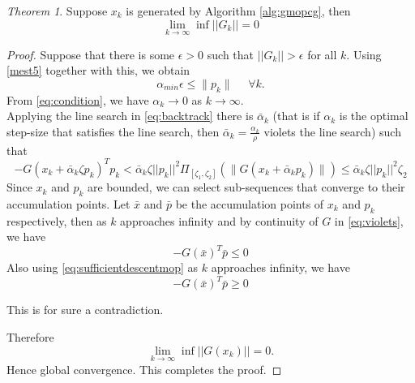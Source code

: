 \documentclass{article}
\theoremstyle{remark}
\newtheorem{theorem}{Theorem}
\begin{document}
{\begin{theorem}
\label{theorem:globalcovMOP}
    Suppose $x_k$ is generated by Algorithm \ref{alg:gmopcg}, then 
    \begin{equation}\label{eq:mgcc}
       \lim_{k\rightarrow \infty}\inf ||G_k||=0 
    \end{equation}  
\end{theorem}
\begin{proof}
    Suppose that there is some $\epsilon>0$ such that $||G_k||>\epsilon$ for all $k$. 
    Using \eqref{mest5} together with this, we obtain
    \begin{equation}
    \label{eq:condition}
    \alpha_{min}\epsilon\leq \|p_k\| ~~~~~~\forall k.
    \end{equation}
    From \eqref{eq:condition}, we have $\alpha_k\rightarrow 0$ as $k\rightarrow \infty$.\\
    Applying the line search in \eqref{eq:backtrack} there is $\bar{\alpha}_k$ (that is if $\alpha_k$ is the optimal step-size that satisfies the line search, then $\bar{\alpha}_k=\frac{\alpha_k}{\rho}$ violets the line search) such that 
    \begin{equation}
    \label{eq:violets}
    -G(x_k+\bar{\alpha}_k\zeta p_k)^Tp_k< \bar{\alpha}_k\zeta||p_k||^2\Pi_{[\zeta_1, \zeta_2]}(\|G(x_k + \bar{\alpha}_k p_k)\|)\leq \bar{\alpha}_k\zeta||p_k||^2\zeta_2
    \end{equation}
    Since $x_k$ and $p_k$ are bounded, we can select sub-sequences that converge to their accumulation points. Let $\bar{x}$ and $\bar{p}$ be the accumulation points of $x_k$ and $p_k$ respectively, then as $k$ approaches infinity and by continuity of $G$ in \eqref{eq:violets}, we have 
    \[
    -G(\bar{x})^T\bar{p}\leq 0
    \]
    Also using \eqref{eq:sufficientdescentmop} as $k$ approaches infinity, we have 
    \[
    -G(\bar{x})^T\bar{p}\geq 0
    \]

    This is for sure a contradiction.
    
    Therefore 
    \[
    \lim_{k\rightarrow \infty}\inf ||G(x_k)||=0.
    \]
    Hence global convergence. This completes the proof.
    

\end{proof}}
\end{document}
